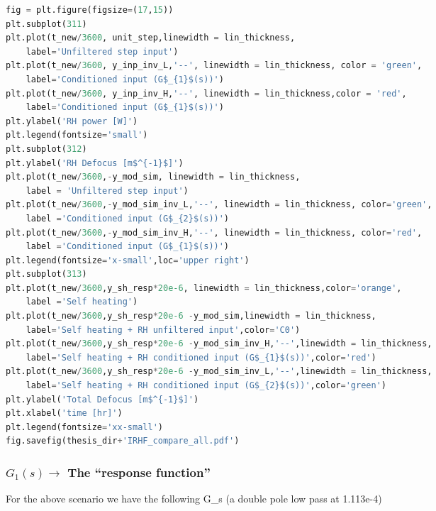 \begin{spacing}{1.2} \begin{lstlisting}[frame=single,language=Python]
fig = plt.figure(figsize=(17,15))
plt.subplot(311)
plt.plot(t_new/3600, unit_step,linewidth = lin_thickness,
    label='Unfiltered step input')
plt.plot(t_new/3600, y_inp_inv_L,'--', linewidth = lin_thickness, color = 'green',
    label='Conditioned input (G$_{1}$(s))')
plt.plot(t_new/3600, y_inp_inv_H,'--', linewidth = lin_thickness,color = 'red', 
    label='Conditioned input (G$_{1}$(s))')
plt.ylabel('RH power [W]')
plt.legend(fontsize='small')
plt.subplot(312)
plt.ylabel('RH Defocus [m$^{-1}$]')
plt.plot(t_new/3600,-y_mod_sim, linewidth = lin_thickness,
    label = 'Unfiltered step input')
plt.plot(t_new/3600,-y_mod_sim_inv_L,'--', linewidth = lin_thickness, color='green',
    label ='Conditioned input (G$_{2}$(s))')
plt.plot(t_new/3600,-y_mod_sim_inv_H,'--', linewidth = lin_thickness, color='red',
    label ='Conditioned input (G$_{1}$(s))')
plt.legend(fontsize='x-small',loc='upper right')
plt.subplot(313)
plt.plot(t_new/3600,y_sh_resp*20e-6, linewidth = lin_thickness,color='orange',
    label ='Self heating')
plt.plot(t_new/3600,y_sh_resp*20e-6 -y_mod_sim,linewidth = lin_thickness,
    label='Self heating + RH unfiltered input',color='C0')
plt.plot(t_new/3600,y_sh_resp*20e-6 -y_mod_sim_inv_H,'--',linewidth = lin_thickness,
    label='Self heating + RH conditioned input (G$_{1}$(s))',color='red')
plt.plot(t_new/3600,y_sh_resp*20e-6 -y_mod_sim_inv_L,'--',linewidth = lin_thickness,
    label='Self heating + RH conditioned input (G$_{2}$(s))',color='green')
plt.ylabel('Total Defocus [m$^{-1}$]')
plt.xlabel('time [hr]')
plt.legend(fontsize='xx-small')
fig.savefig(thesis_dir+'IRHF_compare_all.pdf')
\end{lstlisting} \end{spacing}


\subsubsection*{\texorpdfstring{$G_{1}(s) \rightarrow$}{G1s} The ``response function''}

\noindent For the above scenario we have the following G\_s (a double pole low pass at 1.113e-4)

